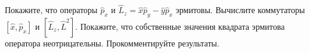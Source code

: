 \documentclass[__main__.tex]{subfiles}
\begin{document}
Покажите, что операторы $\hat{p}_x$ и $\hat{L}_z=\hat{x}\hat{p}_y-\hat{y}\hat{p}_x$ эрмитовы. Вычислите коммутаторы $\left[\hat{x},\hat{p}_x\right]$ и $\left[\hat{L}_z,\hat{L}^2\right]$. Покажите, что собственные значения квадрата эрмитова оператора неотрицательны. Прокомментируйте результаты.\\ 

\end{document}
